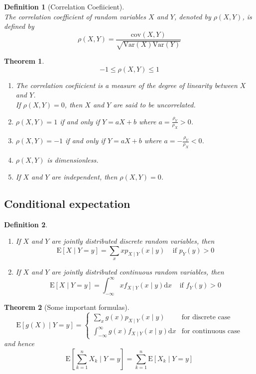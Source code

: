 \documentclass[12pt]{article}
\newcommand{\diff}{\mathrm{d}}
\newcommand{\var}{\mathrm{Var}}
\newcommand{\expec}{\mathrm{E}}
\newcommand{\cov}{\mathrm{cov}}
\newtheorem{definition}{Definition}[section]
\newtheorem{theorem}{Theorem}[section]
\theoremstyle{definition}
\begin{document}
\begin{definition}[Correlation Coefiicient]
\hfill\\\normalfont The correlation coefficient of random variables $X$ and $Y$, denoted by $\rho(X,Y)$, is defined by
\[
\rho(X,Y)=\frac{\cov(X,Y)}{\sqrt{\var(X)\var(Y)}}
\]
\end{definition}
\begin{theorem}
\hfill\\\normalfont
\[
-1\leq \rho(X,Y)\leq 1
\]
\begin{enumerate}
\item The correlation coefiicient is a measure of the degree of linearity between $X$ and $Y$. \\If $\rho(X,Y)=0$, then $X$ and $Y$ are said to be uncorrelated.
\item $\rho(X,Y)=1$ if and only if $Y=aX+b$ where $a = \frac{\rho_Y}{\rho_X}>0$.
\item $\rho(X,Y)=-1$ if and only if $Y=aX+b$ where $a = -\frac{\rho_Y}{\rho_X}<0$.
\item $\rho(X,Y)$ is dimensionless.
\item If $X$ and $Y$ are independent, then $\rho(X,Y)=0$.
\end{enumerate}
\end{theorem}
\subsection{Conditional expectation}
\begin{definition}
\hfill\\\normalfont 
\begin{enumerate}
\item If $X$ and $Y$ are jointly distributed discrete random variables, then
\[
\expec[X\mid Y=y]=\sum_x xp_{X\mid Y}(x\mid y)\;\;\;\;\text{if }p_Y(y)>0
\]
\item If $X$ and $Y$ are jointly distributed continuous random variables, then
\[
\expec[X\mid Y=y]=\int_{-\infty}^\infty xf_{X\mid Y}(x\mid y)\diff x\;\;\;\;\text{if }f_Y(y)>0
\]
\end{enumerate}
\end{definition}
\begin{theorem}[Some important formulas]
\hfill\\\normalfont
\[
\expec[g(X)\mid Y=y]=\begin{cases}
\sum_x g(x)p_{X\mid Y}(x\mid y)&\text{for discrete case}\\
\int_{-\infty}^\infty g(x)f_{X\mid Y}(x\mid y)\diff x&\text{for continuous case}
\end{cases}
\]
and hence
\[
\expec\left[\sum_{k=1}^n X_k\mid Y=y\right]=\sum_{k=1}^n\expec[X_k\mid Y=y]
\]
\end{theorem}
\end{document}
